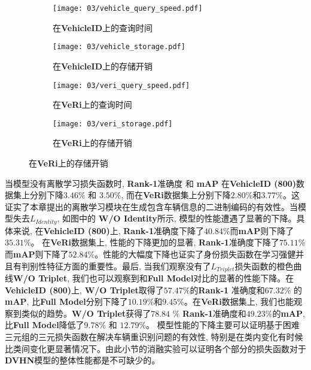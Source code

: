 \begin{figure}[!htp]
    \centering
    \begin{subfigure}{\textwidth}
      \centering
      \texttt{[image: 03/vehicle\_query\_speed.pdf]}
      \caption{在\textbf{VehicleID}上的查询时间}
    \end{subfigure}
    \hspace{1cm}
    \begin{subfigure}{\textwidth}
      \centering
      \texttt{[image: 03/vehicle\_storage.pdf]}
      \caption{在\textbf{VehicleID}上的存储开销}
    \end{subfigure}
    \begin{subfigure}{\textwidth}
        \centering
        \texttt{[image: 03/veri\_query\_speed.pdf]}
        \caption{在\textbf{VeRi}上的查询时间}
      \end{subfigure}
      \begin{subfigure}{\textwidth}
        \centering
        \texttt{[image: 03/veri\_storage.pdf]}
        \caption{在\textbf{VeRi}上的存储开销}
      \end{subfigure}
    \label{fig:sttcost}
  \end{figure}
  当模型没有离散学习损失函数时, \textbf{Rank-1}准确度 和 \textbf{mAP} 在\textbf{VehicleID (800)}数据集上分别下降$3.46 \%$ 和 $3.50 \%$, 而在\textbf{VeRi}数据集上分别下降$2.80 \%$和$3.77 \%$。这证实了本章提出的离散学习模块在生成包含车辆信息的二进制编码的有效性。当模型失去$L_{Identity}$, 如图中的 \textbf{W/O Identity}所示, 模型的性能遭遇了显著的下降。具体来说, 在\textbf{VehicleID (800)}上, \textbf{Rank-1}准确度下降了$40.84 \%$而\textbf{mAP}则下降了$35.31 \%$。 在\textbf{VeRi}数据集上, 性能的下降更加的显著, \textbf{Rank-1}准确度下降了$75.11 \%$而\textbf{mAP}则下降了$52.84 \%$。性能的大幅度下降也证实了身份损失函数在学习强健并且有判别性特征方面的重要性。最后, 当我们观察没有了$L_{Triplet}$损失函数的橙色曲线\textbf{W/O Triplet}, 我们也可以观察到和\textbf{Full Model}对比的显著的性能下降。在\textbf{VehicleID (800)}上, \textbf{W/O Triplet}取得了$57.47 \%$的\textbf{Rank-1} 准确度和$67.32 \%$ 的\textbf{mAP}, 比\textbf{Full Model}分别下降了$10.19 \%$和$9.45 \%$。在\textbf{VeRi}数据集上, 我们也能观察到类似的趋势。\textbf{W/O Triplet}获得了$78.84$ \% \textbf{Rank-1}准确度和$49.23 \%$的\textbf{mAP}, 比\textbf{Full Model}降低了$9.78 \%$ 和 $12.79\%$。 模型性能的下降主要可以证明基于困难三元组的三元损失函数在解决车辆重识别问题的有效性, 特别是在类内变化有时候比类间变化更显著情况下。由此小节的消融实验可以证明各个部分的损失函数对于\textbf{DVHN}模型的整体性能都是不可缺少的。 
  

